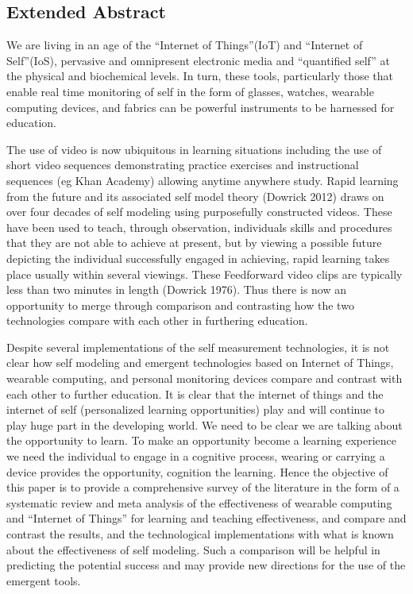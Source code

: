 \subsection{Extended Abstract}


We are living in an age of the “Internet of Things”(IoT) and “Internet of Self”(IoS), pervasive and omnipresent electronic media and “quantified self” at the physical and biochemical levels. In turn, these tools, particularly those that enable real time monitoring of self in the form of glasses, watches, wearable computing devices, and fabrics can be powerful instruments to be harnessed for education. 

The use of video is now ubiquitous in learning situations including the use of short video sequences demonstrating practice exercises and instructional sequences (eg Khan Academy) allowing anytime anywhere study. Rapid learning from the future and its associated self model theory (Dowrick 2012) draws on over four decades of self modeling using purposefully constructed videos. These have been used to teach, through observation, individuals skills and procedures that they are not able to achieve at present, but by viewing a possible future depicting the individual successfully engaged in achieving, rapid learning takes place usually within several viewings. These Feedforward video clips are typically less than two minutes in length (Dowrick 1976). Thus there is now an opportunity to merge through comparison and contrasting how the two technologies compare with each other in furthering education.

Despite several implementations of the self measurement technologies, it is not clear how self modeling and emergent technologies based on Internet of Things, wearable computing, and personal monitoring devices compare and contrast with each other to further education. It is clear that the internet of things and the internet of self (personalized learning opportunities) play and will continue to play huge part in the developing world. We need to be clear we are talking about the opportunity to learn. To make an opportunity become a learning experience we need the individual to engage in a cognitive process, wearing or carrying a device provides the opportunity, cognition the learning. Hence the objective of this paper is to provide a comprehensive survey of the literature in the form of a systematic review and meta analysis of the effectiveness of wearable computing and “Internet of Things” for learning and teaching effectiveness, and compare and contrast the results, and the technological implementations with what is known about the effectiveness of self modeling. Such a comparison will be helpful in predicting the potential success and may provide new directions for the use of the emergent tools.

